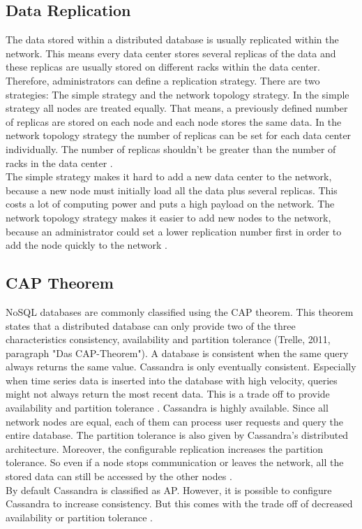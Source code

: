 \subsection{Data Replication}
The data stored within a distributed database is usually replicated within the network. This means every data center stores several replicas of the data and these replicas are usually stored on different racks within the data center. Therefore, administrators can define a replication strategy. There are two strategies: The simple strategy and the network topology strategy. In the simple strategy all nodes are treated equally. That means, a previously defined number of replicas are stored on each node and each node stores the same data. In the network topology strategy the number of replicas can be set for each data center individually. The number of replicas shouldn't be greater than the number of racks in the data center \cite{replication}. \\
The simple strategy makes it hard to add a new data center to the network, because a new node must initially load all the data plus several replicas. This costs a lot of computing power and puts a high payload on the network. The network topology strategy makes it easier to add new nodes to the network, because an administrator could set a lower replication number first in order to add the node quickly to the network \cite{replication} \cite{repApache}.

\subsection{CAP Theorem}
\label{captheroem}
NoSQL databases are commonly classified using the CAP theorem. This theorem states that a distributed database can only provide two of the three characteristics consistency, availability and partition tolerance (Trelle, 2011, paragraph "Das CAP-Theorem"). A database is consistent when the same query always returns the same value. Cassandra is only eventually consistent. Especially when time series data is inserted into the database with high velocity, queries might not always return the most recent data. This is a trade off to provide availability and partition tolerance \cite{architectureOverview}. Cassandra is highly available. Since all network nodes are equal, each of them can process user requests and query the entire database. The partition tolerance is also given by Cassandra's distributed architecture. Moreover, the configurable replication increases the partition tolerance. So even if a node stops communication or leaves the network, all the stored data can still be accessed by the other nodes \cite{learningCassandra} \cite{realTimeAnal}. \\
By default Cassandra is classified as AP. However, it is possible to configure Cassandra to increase consistency. But this comes with the trade off of decreased availability or partition tolerance \cite{learningCassandra}.

